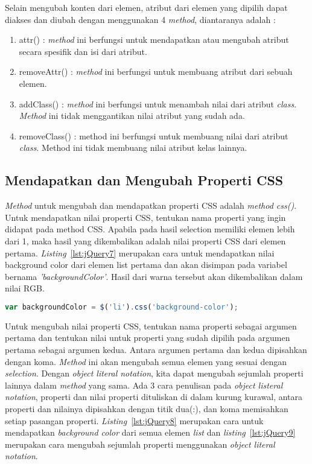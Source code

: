 Selain mengubah konten dari elemen, atribut dari elemen yang dipilih dapat diakses dan diubah dengan menggunakan 4 \textit{method}, diantaranya adalah :

\begin{enumerate}
	\item attr() : \textit{method} ini berfungsi untuk mendapatkan atau mengubah atribut secara spesifik dan isi dari atribut.
	\item removeAttr() : \textit{method} ini berfungsi untuk membuang atribut dari sebuah elemen.
	\item addClass() : \textit{method} ini berfungsi untuk menambah nilai dari atribut \textit{class}. \textit{Method} ini tidak menggantikan nilai atribut yang sudah ada.
	\item removeClass() : method ini berfungsi untuk membuang nilai dari atribut \textit{class}. Method ini tidak membuang nilai atribut kelas lainnya.
\end{enumerate}

\subsection{Mendapatkan dan Mengubah Properti CSS}
\textit{Method} untuk mengubah dan mendapatkan properti CSS adalah \textit{method css()}. Untuk mendapatkan nilai properti CSS, tentukan nama properti yang ingin didapat pada method CSS. Apabila pada hasil selection memiliki elemen lebih dari 1, maka hasil yang dikembalikan adalah nilai properti CSS dari elemen pertama. \textit{Listing}~\ref{lst:jQuery7} merupakan cara untuk mendapatkan nilai background color dari elemen list pertama dan akan disimpan pada variabel bernama \textit{'backgroundColor'}. Hasil dari warna tersebut akan dikembalikan dalam nilai RGB. 

\begin{lstlisting}[language=Javascript, caption=Mendapatkan nilai warna \textit{background color} dari elemen \textit{list} pertama, label={lst:jQuery7}]
	var backgroundColor = $('li').css('background-color');
\end{lstlisting}

Untuk mengubah nilai properti CSS, tentukan nama properti sebagai argumen pertama dan tentukan nilai untuk properti yang sudah dipilih pada argumen pertama sebagai argumen kedua. Antara argumen pertama dan kedua dipisahkan dengan koma. \textit{Method} ini akan mengubah semua elemen yang sesuai dengan \textit{selection}. Dengan \textit{object literal notation}, kita dapat mengubah sejumlah properti lainnya dalam \textit{method} yang sama. Ada 3 cara penulisan pada \textit{object listeral notation}, properti dan nilai properti dituliskan di dalam kurung kurawal, antara properti dan nilainya dipisahkan dengan titik dua(:), dan koma memisahkan setiap pasangan properti. \textit{Listing}~\ref{lst:jQuery8} merupakan cara untuk mendapatkan \textit{background color} dari semua elemen \textit{list} dan \textit{listing}~\ref{lst:jQuery9} merupakan cara mengubah sejumlah properti menggunakan \textit{object literal notation}.


